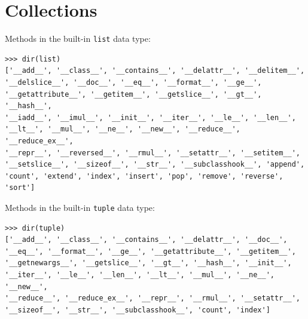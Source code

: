 \documentclass[8pt,a4paper,compress,handout]{beamer}
\begin{document}
\section{Collections}
\begin{frame}[fragile]
Methods in the built-in \lstinline{list} data type:
\begin{lstlisting}[language={}]
>>> dir(list)
['__add__', '__class__', '__contains__', '__delattr__', '__delitem__', 
'__delslice__', '__doc__', '__eq__', '__format__', '__ge__', 
'__getattribute__', '__getitem__', '__getslice__', '__gt__', '__hash__', 
'__iadd__', '__imul__', '__init__', '__iter__', '__le__', '__len__', 
'__lt__', '__mul__', '__ne__', '__new__', '__reduce__', '__reduce_ex__', 
'__repr__', '__reversed__', '__rmul__', '__setattr__', '__setitem__', 
'__setslice__', '__sizeof__', '__str__', '__subclasshook__', 'append', 
'count', 'extend', 'index', 'insert', 'pop', 'remove', 'reverse', 'sort']
\end{lstlisting}

\bigskip

Methods in the built-in \lstinline{tuple} data type:
\begin{lstlisting}[language={}]
>>> dir(tuple)
['__add__', '__class__', '__contains__', '__delattr__', '__doc__', 
'__eq__', '__format__', '__ge__', '__getattribute__', '__getitem__', 
'__getnewargs__', '__getslice__', '__gt__', '__hash__', '__init__', 
'__iter__', '__le__', '__len__', '__lt__', '__mul__', '__ne__', '__new__', 
'__reduce__', '__reduce_ex__', '__repr__', '__rmul__', '__setattr__', 
'__sizeof__', '__str__', '__subclasshook__', 'count', 'index']
\end{lstlisting}
\end{frame}
\end{document}
